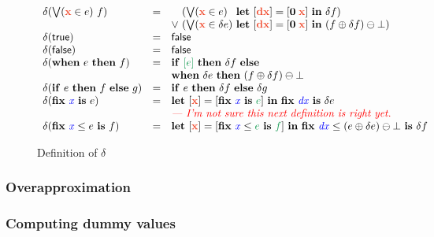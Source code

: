\documentclass{rntz}
\newcommand{\preserve}[1]{{\color{ForestGreen}{#1}}}
\newcommand{\preservedisc}[1]{\preserve{\disc{#1}}}
\newcommand{\comment}[1]{\textit{--- {#1}}}
\begin{document}
\begin{figure*}
\[\begin{array}{lcll}
    \delta(\setelim{\d{x}}{e}{f})
    &=& \phantom{\vee~} (\setelim{\d{x}}{e}
          {\phantom{\delta} \letdisc{\d{dx}}{\disc{\zero\; \d{x}}} \delta f})\\
    && \vee~ (\setelim{\d{x}}{\delta e}
          {\letdisc{\d{dx}}{\disc{\zero\; \d{x}}}
            (f \oplus \delta f) \ominus \unit})\\

    \delta(\etrue) &=& \efalse\\
    \delta(\efalse) &=& \efalse\\
    \delta(\when{e}{f})
    &=& \ifthen{\preservedisc{e}}{\delta f}{}\\
    && \when{\delta e}{(f \oplus \delta f) \ominus \unit}
    \\
    \delta(\ifthen{e}{f}{g}) &=& \ifthen{e}{\delta f}{\delta g}\\
    \delta(\fix{\m{x}}{e}) &=&
    \letdisc{\d{x}}
            {\disc{\fix{\m{x}} \preserve{e}}}
            {\fix{\m{dx}} \delta e}\\
    && \todo{\comment{I'm not sure this next definition is right yet.}}\\
    \delta(\fixle{\m{x}}{e}{f}) &=&
      \letdisc{\d x}{\disc{\fixle{\m x}{\preserve{e}}{\preserve{f}}}}
      \fixle{\m{dx}}{(e \oplus \delta e) \ominus \unit}{\delta f}
  \end{array}
  \]
  \caption{Definition of $\delta$}
  \label{fig:delta}
\end{figure*}


\subsubsection{Overapproximation}



\subsubsection{Computing dummy values}
\end{document}
